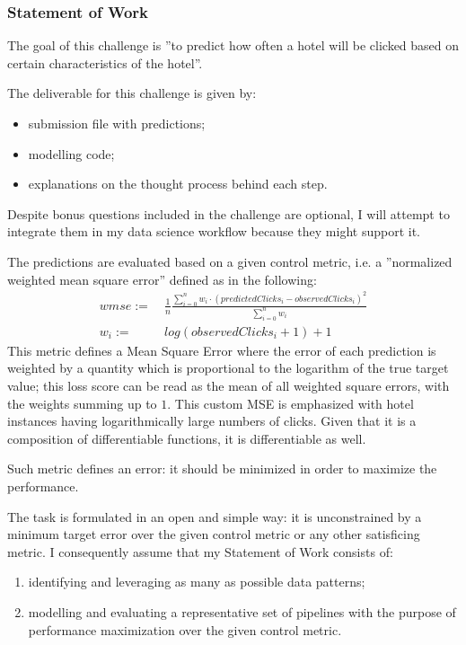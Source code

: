 \documentclass[preprint,12pt,3p]{elsarticle}
\begin{document}
\subsubsection{Statement of Work}
\label{statement}
The goal of this challenge is ''to predict how often a hotel will be clicked based on certain characteristics of the hotel''. 

The deliverable for this challenge is given by:
\begin{itemize}
	\item submission file with predictions;
	\item modelling code;
	\item explanations on the thought process behind each step.
\end{itemize}
Despite bonus questions included in the challenge are optional, I will attempt to integrate them in my data science workflow because they might support it.

The predictions are evaluated based on a given control metric, i.e. a  ''normalized weighted mean square error'' defined as in the following:
\begin{align}
wmse := & \ \frac{1}{n}\frac{\sum_{i=0}^{n}w_i\cdot(predictedClicks_i - observedClicks_i)^2}{\sum_{i=0}^{n}w_i} \label{wmse}\\
w_i := & \ log(observedClicks_i + 1) + 1 \label{weight}
\end{align}
This metric defines a Mean Square Error where the error of each prediction is weighted by a quantity which is proportional to the logarithm of the true target value; this loss score can be read as the mean of all weighted square errors, with the weights summing up to $1$. This custom MSE is emphasized with hotel instances having logarithmically large numbers of clicks. Given that it is a composition of differentiable functions, it is differentiable as well.

Such metric defines an error: it should be minimized in order to maximize the performance.

The task is formulated in an open and simple way: it is unconstrained by a minimum target error over the given control metric or any other satisficing metric.
I consequently assume that my Statement of Work consists of:
\begin{enumerate}
	\item identifying and leveraging as many as possible data patterns;
	\item modelling and evaluating a representative set of pipelines with the purpose of performance maximization over the given control metric.
\end{enumerate}
\end{document}
